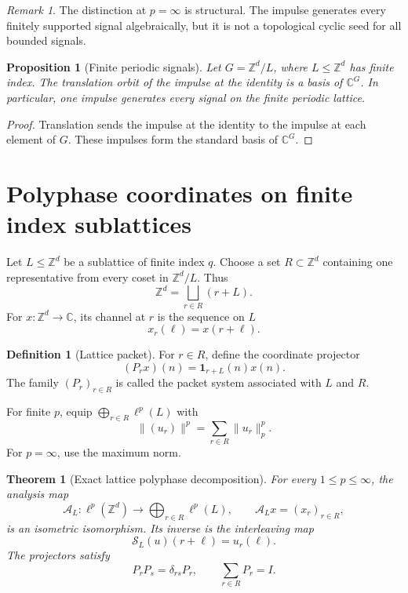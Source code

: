 \documentclass{aomart}
\newtheorem{theorem}{Theorem}[section]
\newtheorem{proposition}[proposition]{Proposition}
\theoremstyle{definition}
\newtheorem{definition}[definition]{Definition}
\theoremstyle{remark}
\newtheorem{remark}[remark]{Remark}
\newcommand{\CC}{\mathbb C}
\newcommand{\ZZ}{\mathbb Z}
\newcommand{\Acal}{\mathcal A}
\newcommand{\Scal}{\mathcal S}
\newcommand{\one}{\mathbf 1}
\begin{document}
\begin{remark}\label{rem:infinity_boundary}
The distinction at \(p=\infty\) is structural. The impulse generates every finitely supported signal algebraically, but it is not a topological cyclic seed for all bounded signals.
\end{remark}

\begin{proposition}[Finite periodic signals]\label{prop:finite_periodic}
Let \(G=\ZZ^d/L\), where \(L\leq\ZZ^d\) has finite index. The translation orbit of the impulse at the identity is a basis of \(\CC^G\). In particular, one impulse generates every signal on the finite periodic lattice.
\end{proposition}

\begin{proof}
Translation sends the impulse at the identity to the impulse at each element of \(G\). These impulses form the standard basis of \(\CC^G\).
\end{proof}

\section{Polyphase coordinates on finite index sublattices}\label{sec:polyphase}

Let \(L\leq\ZZ^d\) be a sublattice of finite index \(q\). Choose a set \(R\subset\ZZ^d\) containing one representative from every coset in \(\ZZ^d/L\). Thus
\[
\ZZ^d=\bigsqcup_{r\in R}(r+L).
\]
For \(x:\ZZ^d\to\CC\), its channel at \(r\) is the sequence on \(L\)
\[
x_r(\ell)=x(r+\ell).
\]

\begin{definition}[Lattice packet]\label{def:lattice_packet}
For \(r\in R\), define the coordinate projector
\[
(P_rx)(n)=\one_{r+L}(n)x(n).
\]
The family \((P_r)_{r\in R}\) is called the packet system associated with \(L\) and \(R\).
\end{definition}

For finite \(p\), equip \(\bigoplus_{r\in R}\ell^p(L)\) with
\[
\|(u_r)\|^p=\sum_{r\in R}\|u_r\|_p^p.
\]
For \(p=\infty\), use the maximum norm.

\begin{theorem}[Exact lattice polyphase decomposition]\label{thm:lattice_polyphase}
For every \(1\leq p\leq\infty\), the analysis map
\[
\Acal_L:\ell^p(\ZZ^d)\longrightarrow\bigoplus_{r\in R}\ell^p(L),
\qquad
\Acal_Lx=(x_r)_{r\in R},
\]
is an isometric isomorphism. Its inverse is the interleaving map
\[
\Scal_L(u)(r+\ell)=u_r(\ell).
\]
The projectors satisfy
\[
P_rP_s=\delta_{rs}P_r,
\qquad
\sum_{r\in R}P_r=I.
\]
\end{theorem}
\end{document}
